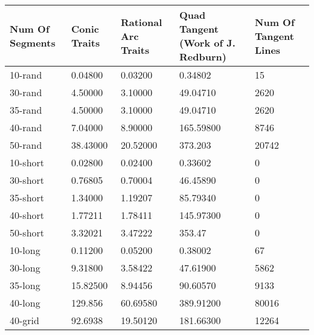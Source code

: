 \documentclass[11pt]{article}
\begin{document}
\begin{table}[ht] 
\caption{} %
\begin{tabular}{p{2cm} | p{3cm} | p{2cm} | p{3cm} | p{2cm}} %
\hline\hline %
Num Of Segments & Conic Traits & Rational Arc Traits & Quad Tangent (Work of J. Redburn) & Num Of Tangent Lines\\
\hline %
10-rand & 0.04800 & 0.03200 & 0.34802 & 15\\
\hline %
30-rand & 4.50000 & 3.10000 & 49.04710 & 2620\\ 
\hline %
35-rand & 4.50000 & 3.10000 & 49.04710 & 2620\\
\hline %
40-rand & 7.04000 & 8.90000 & 165.59800 & 8746\\
\hline %
50-rand & 38.43000 & 20.52000 & 373.203 & 20742\\
\hline %
10-short & 0.02800 & 0.02400 & 0.33602 & 0\\
\hline %
30-short & 0.76805 & 0.70004 & 46.45890 & 0\\
\hline %
35-short & 1.34000 & 1.19207 & 85.79340 & 0\\
\hline %
40-short & 1.77211 & 1.78411 & 145.97300 & 0\\
\hline %
50-short & 3.32021 & 3.47222 & 353.47 & 0\\
\hline %
10-long & 0.11200 & 0.05200 & 0.38002 & 67\\
\hline %
30-long & 9.31800 & 3.58422 & 47.61900 & 5862\\
\hline %
35-long & 15.82500 & 8.94456 & 90.60570 & 9133\\
\hline %
40-long & 129.856 & 60.69580 & 389.91200 & 80016\\
\hline %
40-grid & 92.6938 & 19.50120 & 181.66300 & 12264\\
\hline %
\end{tabular} 
\label{table:results} %
\end{table}
\label{sec:experimental-results}



\appendix
\end{document}
